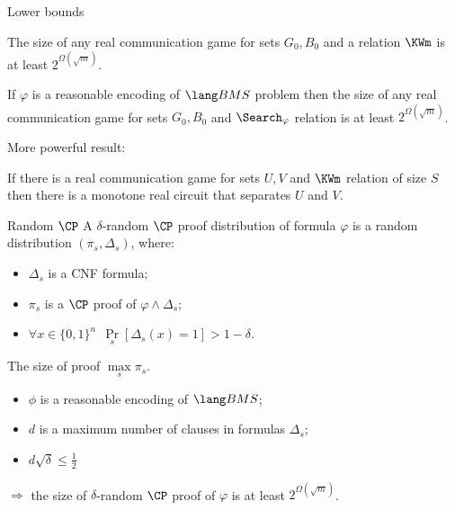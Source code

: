 \begin{frame}{Lower bounds}


    \begin{theorem}
        The size of any real communication game for sets $G_0, B_0$ and a relation $\KWm$ is at least $2^{\Omega(\sqrt{m})}$.

        If $\varphi$ is a reasonable encoding of $\BMS$ problem then the size of any real communication game for sets $G_0,
        B_0$ and $\Search_{\varphi}$ relation is at least $2^{\Omega(\sqrt{m})}$.
    \end{theorem}

    \pause
    More powerful result:
    \begin{theorem}
        If there is a real communication game for sets $U, V$ and $\KWm$ relation of size $S$ then there
        is a monotone real circuit that separates $U$ and $V$.
    \end{theorem}
\end{frame}


\begin{frame}{Random $\CP$}
    A $\delta$-random $\CP$ proof distribution of formula $\varphi$ is a random distribution $(\pi_s,
    \Delta_s)$, where:
    \begin{itemize}
        \item $\Delta_s$ is a CNF formula;
        \item $\pi_s$ is a $\CP$ proof of $\varphi \land \Delta_s$;
        \item $\forall x \in \{0, 1\}^n ~~ \Pr\limits_s[\Delta_s(x) = 1] > 1 - \delta$.
    \end{itemize}

    The size of proof $\max\limits_s \pi_s$.
    \pause

    \begin{theorem}
        \begin{itemize}
            \item $\phi$ is a reasonable encoding of $\BMS$;
            \item $d$ is a maximum number of clauses in formulas $\Delta_s$;
            \item $d \sqrt{\delta} \le \frac{1}{2}$
        \end{itemize}
        $\Rightarrow$ the size of $\delta$-random $\CP$ proof of $\varphi$ is at least
        $2^{\Omega(\sqrt{m})}$.
    \end{theorem}
\end{frame}


